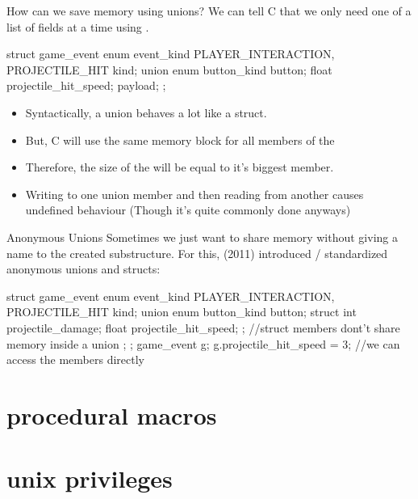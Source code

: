 \documentclass[10pt,graphics,aspectratio=169,table]{beamer}
\begin{document}
\begin{frame}[fragile]{How can we save memory using unions?}
    We can tell C that we only need one of a list of fields at a 
    time using .

    \begin{codeblock}
struct game_event{
    enum event_kind {PLAYER_INTERACTION, PROJECTILE_HIT} kind;
    union {
        enum button_kind button;    
        float projectile_hit_speed; 
    } payload;
};
    \end{codeblock}
    \begin{itemize}
        \item Syntactically, a union behaves a lot like a struct.
        \item But, C will use the same memory block for all members
        of the 
        \item Therefore, the size of the  will 
        be equal to it's biggest member.
        \item Writing to one union member and then reading from another causes
            undefined behaviour (Though it's quite commonly done anyways)
    \end{itemize}
\end{frame}

\begin{frame}[fragile]{Anonymous Unions}
    Sometimes we just want to share memory without giving a name to the 
    created substructure. For this,  (2011) introduced / standardized 
    anonymous unions and structs:

    \begin{codeblock}
struct game_event{
    enum event_kind {PLAYER_INTERACTION, PROJECTILE_HIT} kind;
    union {
        enum button_kind button;    
        struct {
            int projectile_damage; 
            float projectile_hit_speed; 
        }; //struct members dont't share memory inside a union
    };
};
game_event g;
g.projectile_hit_speed = 3; //we can access the members directly
    \end{codeblock}
\end{frame}


\section{procedural macros}

\section{unix privileges}
\end{document}
